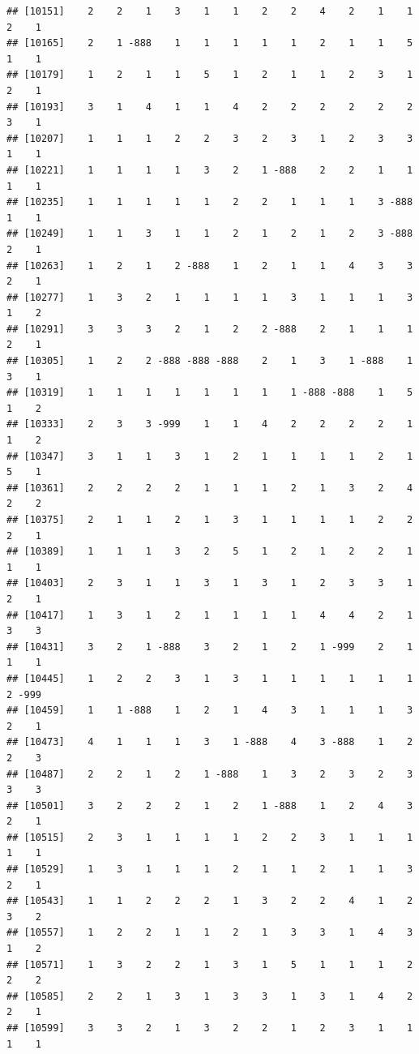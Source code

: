 \documentclass[
  12pt,
  openany]{book}
\begin{document}
\begin{verbatim}
## [10151]    2    2    1    3    1    1    2    2    4    2    1    1    2    1
## [10165]    2    1 -888    1    1    1    1    1    2    1    1    5    1    1
## [10179]    1    2    1    1    5    1    2    1    1    2    3    1    2    1
## [10193]    3    1    4    1    1    4    2    2    2    2    2    2    3    1
## [10207]    1    1    1    2    2    3    2    3    1    2    3    3    1    1
## [10221]    1    1    1    1    3    2    1 -888    2    2    1    1    1    1
## [10235]    1    1    1    1    1    2    2    1    1    1    3 -888    1    1
## [10249]    1    1    3    1    1    2    1    2    1    2    3 -888    2    1
## [10263]    1    2    1    2 -888    1    2    1    1    4    3    3    2    1
## [10277]    1    3    2    1    1    1    1    3    1    1    1    3    1    2
## [10291]    3    3    3    2    1    2    2 -888    2    1    1    1    2    1
## [10305]    1    2    2 -888 -888 -888    2    1    3    1 -888    1    3    1
## [10319]    1    1    1    1    1    1    1    1 -888 -888    1    5    1    2
## [10333]    2    3    3 -999    1    1    4    2    2    2    2    1    1    2
## [10347]    3    1    1    3    1    2    1    1    1    1    2    1    5    1
## [10361]    2    2    2    2    1    1    1    2    1    3    2    4    2    2
## [10375]    2    1    1    2    1    3    1    1    1    1    2    2    2    1
## [10389]    1    1    1    3    2    5    1    2    1    2    2    1    1    1
## [10403]    2    3    1    1    3    1    3    1    2    3    3    1    2    1
## [10417]    1    3    1    2    1    1    1    1    4    4    2    1    3    3
## [10431]    3    2    1 -888    3    2    1    2    1 -999    2    1    1    1
## [10445]    1    2    2    3    1    3    1    1    1    1    1    1    2 -999
## [10459]    1    1 -888    1    2    1    4    3    1    1    1    3    2    1
## [10473]    4    1    1    1    3    1 -888    4    3 -888    1    2    2    3
## [10487]    2    2    1    2    1 -888    1    3    2    3    2    3    3    3
## [10501]    3    2    2    2    1    2    1 -888    1    2    4    3    2    1
## [10515]    2    3    1    1    1    1    2    2    3    1    1    1    1    1
## [10529]    1    3    1    1    1    2    1    1    2    1    1    3    2    1
## [10543]    1    1    2    2    2    1    3    2    2    4    1    2    3    2
## [10557]    1    2    2    1    1    2    1    3    3    1    4    3    1    2
## [10571]    1    3    2    2    1    3    1    5    1    1    1    2    2    2
## [10585]    2    2    1    3    1    3    3    1    3    1    4    2    2    1
## [10599]    3    3    2    1    3    2    2    1    2    3    1    1    1    1

\end{verbatim}
\end{document}

